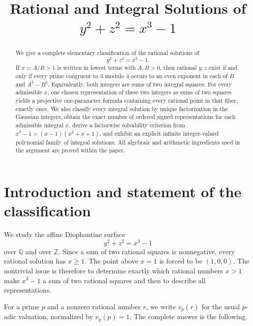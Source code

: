\documentclass[11pt,a4paper]{article}
\title{Rational and Integral Solutions of\\[2mm]
\texorpdfstring{$y^2+z^2=x^3-1$}{y2 + z2 = x3 - 1}}
\author{}
\date{}
\numberwithin{equation}{section}
\theoremstyle{definition}
\theoremstyle{remark}
\newcommand{\Z}{\mathbb Z}
\newcommand{\Q}{\mathbb Q}
\begin{document}
\maketitle

\begin{abstract}
We give a complete elementary classification of the rational solutions of
\[
 y^2+z^2=x^3-1.
\]
If $x=A/B>1$ is written in lowest terms with $A,B>0$, then rational $y,z$ exist if and only if every prime congruent to $3$ modulo $4$ occurs to an even exponent in each of $B$ and $A^3-B^3$. Equivalently, both integers are sums of two integral squares. For every admissible $x$, one chosen representation of these two integers as sums of two squares yields a projective one-parameter formula containing every rational point in that fiber, exactly once. We also classify every integral solution by unique factorization in the Gaussian integers, obtain the exact number of ordered signed representations for each admissible integral $x$, derive a factorwise solvability criterion from $x^3-1=(x-1)(x^2+x+1)$, and exhibit an explicit infinite integer-valued polynomial family of integral solutions. All algebraic and arithmetic ingredients used in the argument are proved within the paper.
\end{abstract}

\section{Introduction and statement of the classification}

We study the affine Diophantine surface
\begin{equation}
 y^2+z^2=x^3-1
 \label{eq:surface}
\end{equation}
over $\Q$ and over $\Z$. Since a sum of two rational squares is nonnegative, every rational solution has $x\geq 1$. The point above $x=1$ is forced to be $(1,0,0)$. The nontrivial issue is therefore to determine exactly which rational numbers $x>1$ make $x^3-1$ a sum of two rational squares and then to describe all representations.

For a prime $p$ and a nonzero rational number $r$, we write $v_p(r)$ for the usual $p$-adic valuation, normalized by $v_p(p)=1$. The complete answer is the following.
\end{document}
